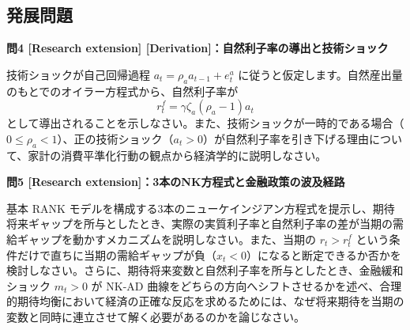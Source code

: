\documentclass[
  japanese,
  lualatex,
  ja=standard,
  12pt,
  a4paper]{ltjsarticle}
\begin{document}
\Needspace{0.18\textheight}

\subsection{発展問題}\label{ux767aux5c55ux554fux984c}

\textbf{問4 {[}Research extension{]}
{[}Derivation{]}：自然利子率の導出と技術ショック}

技術ショックが自己回帰過程 \(a_t=\rho_a a_{t-1}+e_t^a\)
に従うと仮定します。自然産出量のもとでのオイラー方程式から、自然利子率が
\[
r_t^f=\gamma\zeta_a(\rho_a-1)a_t
\]
として導出されることを示しなさい。また、技術ショックが一時的である場合（\(0\leq\rho_a<1\)）、正の技術ショック（\(a_t>0\)）が自然利子率を引き下げる理由について、家計の消費平準化行動の観点から経済学的に説明しなさい。

\Needspace{0.18\textheight}

\textbf{問5 {[}Research extension{]}：3本のNK方程式と金融政策の波及経路}

基本 RANK
モデルを構成する3本のニューケインジアン方程式を提示し、期待将来ギャップを所与としたとき、実際の実質利子率と自然利子率の差が当期の需給ギャップを動かすメカニズムを説明しなさい。また、当期の
\(r_t>r_t^f\)
という条件だけで直ちに当期の需給ギャップが負（\(x_t<0\)）になると断定できるか否かを検討しなさい。さらに、期待将来変数と自然利子率を所与としたとき、金融緩和ショック
\(m_t>0\) が NK-AD
曲線をどちらの方向へシフトさせるかを述べ、合理的期待均衡において経済の正確な反応を求めるためには、なぜ将来期待を当期の変数と同時に連立させて解く必要があるのかを論じなさい。
\end{document}
